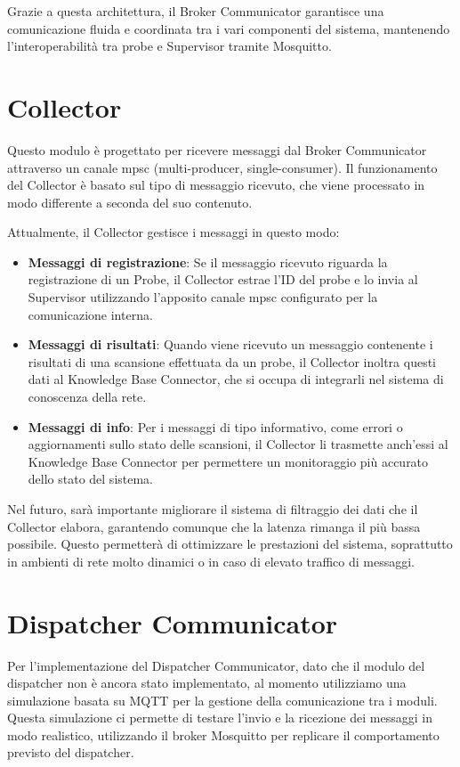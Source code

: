 \documentclass[target=bach,aauheader=,style=]{thud}
\begin{document}
Grazie a questa architettura, il Broker Communicator garantisce una comunicazione fluida e coordinata tra i vari componenti del sistema, mantenendo l'interoperabilità tra probe e Supervisor tramite Mosquitto.

\section{Collector}
Questo modulo è progettato per ricevere messaggi dal Broker Communicator attraverso un canale mpsc (multi-producer, single-consumer). Il funzionamento del Collector è basato sul tipo di messaggio ricevuto, che viene processato in modo differente a seconda del suo contenuto.

Attualmente, il Collector gestisce i messaggi in questo modo:
\begin{itemize}
  \item \textbf{Messaggi di registrazione}: Se il messaggio ricevuto riguarda la registrazione di un Probe, il Collector estrae l'ID del probe e lo invia al Supervisor utilizzando l'apposito canale mpsc configurato per la comunicazione interna.

  \item \textbf{Messaggi di risultati}: Quando viene ricevuto un messaggio contenente i risultati di una scansione effettuata da un probe, il Collector inoltra questi dati al Knowledge Base Connector, che si occupa di integrarli nel sistema di conoscenza della rete.

  \item \textbf{Messaggi di info}: Per i messaggi di tipo informativo, come errori o aggiornamenti sullo stato delle scansioni, il Collector li trasmette anch'essi al Knowledge Base Connector per permettere un monitoraggio più accurato dello stato del sistema.
\end{itemize}

Nel futuro, sarà importante migliorare il sistema di filtraggio dei dati che il Collector elabora, garantendo comunque che la latenza rimanga il più bassa possibile. Questo permetterà di ottimizzare le prestazioni del sistema, soprattutto in ambienti di rete molto dinamici o in caso di elevato traffico di messaggi.

\section{Dispatcher Communicator}
Per l'implementazione del Dispatcher Communicator, dato che il modulo del dispatcher non è ancora stato implementato, al momento utilizziamo una simulazione basata su MQTT per la gestione della comunicazione tra i moduli. Questa simulazione ci permette di testare l'invio e la ricezione dei messaggi in modo realistico, utilizzando il broker Mosquitto per replicare il comportamento previsto del dispatcher.
\end{document}
